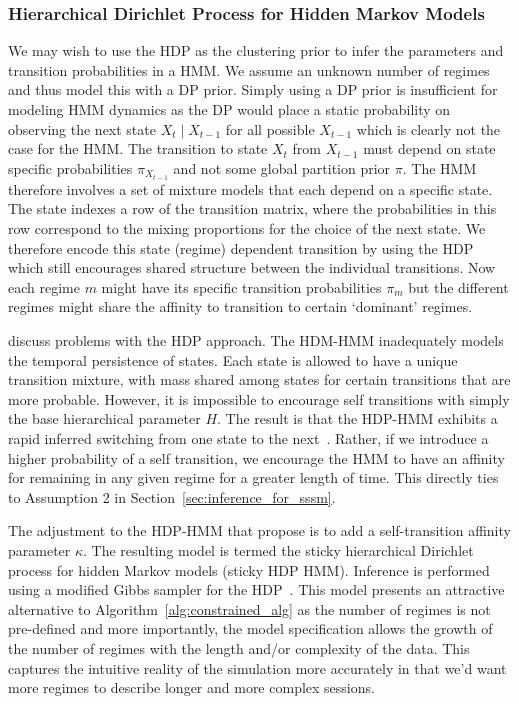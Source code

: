 \subsubsection{Hierarchical Dirichlet Process for Hidden Markov Models}
We may wish to use the HDP as the clustering prior to infer the parameters and transition probabilities in a HMM. We assume an unknown number of regimes and thus model this with a DP prior. Simply using a DP prior is insufficient for modeling HMM dynamics as the DP would place a static probability on observing the next state $X_t \mid X_{t-1}$ for all possible $X_{t-1}$ which is clearly not the case for the HMM. The transition to state $X_t$ from $X_{t-1}$ must depend on state specific probabilities $\pi_{X_{t-1}}$ and not some global partition prior $\pi$. The HMM therefore involves a set of mixture models that each depend on a specific state. The state indexes a row of the transition matrix, where the probabilities in this row correspond to the mixing proportions for the choice of the next state. We therefore encode this state (regime) dependent transition by using the HDP which still encourages shared structure between the individual transitions. Now each regime $m$ might have its specific transition probabilities $\pi_m$ but the different regimes might share the affinity to transition to certain `dominant' regimes.

\cite{fox2009nonparametric, fox2007hierarchical} discuss problems with the HDP approach. The HDM-HMM inadequately models the temporal persistence of states. Each state is allowed to have a unique transition mixture, with mass shared among states for certain transitions that are more probable. However, it is impossible to encourage self transitions with simply the base hierarchical parameter $H$. The result is that the HDP-HMM exhibits a rapid inferred switching from one state to the next~\citep{fox2007hierarchical}. Rather, if we introduce a higher probability of a self transition, we encourage the HMM to have an affinity for remaining in any given regime for a greater length of time. This directly ties to Assumption 2 in Section~\ref{sec:inference_for_sssm}.

The adjustment to the HDP-HMM that \cite{fox2009nonparametric,fox2007hierarchical} propose is to add a self-transition affinity parameter $\kappa$. The resulting model is termed the sticky hierarchical Dirichlet process for hidden Markov models (sticky HDP HMM). Inference is performed using a modified Gibbs sampler for the HDP~\citep{teh2005sharing}. This model presents an attractive alternative to Algorithm~\ref{alg:constrained_alg} as the number of regimes is not pre-defined and more importantly, the model specification allows the growth of the number of regimes with the length and/or complexity of the data. This captures the intuitive reality of the simulation more accurately in that we'd want more regimes to describe longer and more complex sessions.

